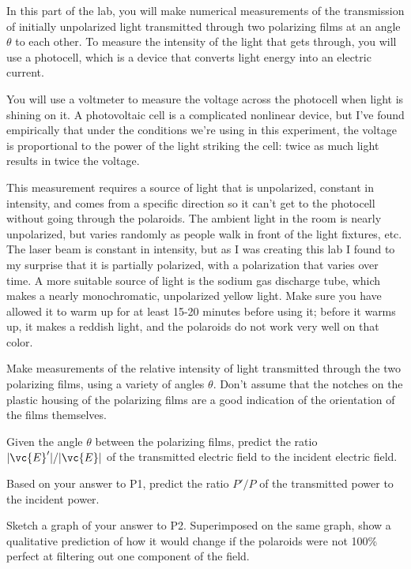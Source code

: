 
In this part of the lab, you will make numerical measurements
of the transmission of initially unpolarized light
transmitted through two polarizing films at an angle $\theta
$ to each other. To measure the intensity of the light that
gets through, you will use a photocell, which is a device
that converts light energy into an electric current.

You will use a voltmeter to measure the voltage across the
photocell when light is shining on it. A photovoltaic cell is
a complicated nonlinear device, but I've found empirically
that under the conditions we're using in this experiment,
the voltage is proportional to the power of the light striking
the cell: twice as much light results in twice the voltage.

This measurement requires a source of light that is
unpolarized, constant in intensity, and comes from a
specific direction so it can't get to the photocell without
going through the polaroids. The ambient light in the room
is nearly unpolarized, but varies randomly as people walk in
front of the light fixtures, etc. The laser beam is constant
in intensity, but as I was creating this lab I found to my
surprise that it is partially polarized, with a polarization
that varies over time. A more suitable source of light is the
sodium gas discharge tube, which makes a nearly monochromatic,
unpolarized yellow light. Make sure you have allowed it to
warm up for at least 15-20 minutes before using it; before
it warms up, it makes a reddish light, and the polaroids do
not work very well on that color.

Make measurements of the relative intensity of light
transmitted through the two polarizing films, using a
variety of angles $\theta $. Don't assume that the notches
on the plastic housing of the polarizing films are a good
indication of the orientation of the films themselves.

\prelab

\prelabquestion Given the angle $\theta$ between the polarizing films, predict the 
ratio $|\vc{E}'|/|\vc{E}|$ of the transmitted electric field to the incident
electric field.

\prelabquestion Based on your answer to P1, predict the ratio $P'/P$ of the transmitted
power to the incident power.

\prelabquestion Sketch a graph of your answer to P2. Superimposed on the same graph, show
a qualitative prediction of how it would change if the polaroids were not
100\% perfect at filtering out one component of the field.

